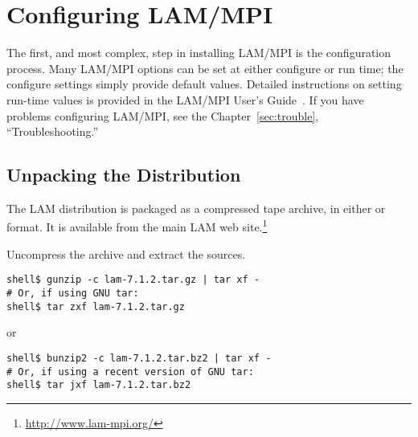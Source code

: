 %
% 
%
%

\chapter{Configuring LAM/MPI}
\label{sec:configure}

The first, and most complex, step in installing LAM/MPI is the
configuration process.  Many LAM/MPI options can be set at either
configure or run time; the configure settings simply provide default
values.  Detailed instructions on setting run-time values is provided
in the LAM/MPI User's Guide~\cite{lamteam03:_lam_mpi_user_guide}.  If
you have problems configuring LAM/MPI, see the
Chapter~\ref{sec:trouble}, ``Troubleshooting.''



\section{Unpacking the Distribution}

The LAM distribution is packaged as a compressed tape archive, in
either  or  format.  It is available from the
main LAM web site.\footnote{\url{http://www.lam-mpi.org/}}

Uncompress the archive and extract the sources. 

\lstset{style=lam-cmdline}
\begin{lstlisting}
shell$ gunzip -c lam-7.1.2.tar.gz | tar xf -
# Or, if using GNU tar:
shell$ tar zxf lam-7.1.2.tar.gz
\end{lstlisting}

or 

\lstset{style=lam-cmdline}
\begin{lstlisting}
shell$ bunzip2 -c lam-7.1.2.tar.bz2 | tar xf -
# Or, if using a recent version of GNU tar:
shell$ tar jxf lam-7.1.2.tar.bz2
\end{lstlisting}


